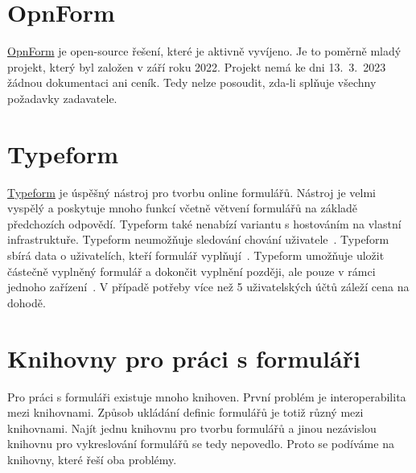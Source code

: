 \section*{OpnForm}\label{sec:opnform}

\href{https://opnform.com/}{OpnForm} je open-source řešení, které je aktivně vyvíjeno.
Je to poměrně mladý projekt, který byl založen v září roku 2022.
Projekt nemá ke dni 13.~3.~2023 žádnou dokumentaci ani ceník.
Tedy nelze posoudit, zda-li splňuje všechny požadavky zadavatele.

\section*{Typeform}\label{sec:typeform}

\href{https://www.typeform.com/}{Typeform} je úspěšný nástroj pro tvorbu online formulářů.
Nástroj je velmi vyspělý a poskytuje mnoho funkcí včetně větvení formulářů na základě předchozích odpovědí.
Typeform také nenabízí variantu s hostováním na vlastní infrastruktuře.
Typeform neumožňuje sledování chování uživatele~\cite{user-tracking-typeform}.
Typeform sbírá data o uživatelích, kteří formulář vyplňují~\cite{user-data-typeform}.
Typeform umožňuje uložit částečně vyplněný formulář a dokončit vyplnění později, ale pouze v rámci jednoho zařízení~\cite{save-and-return-typeform}.
V případě potřeby více než 5 uživatelských účtů záleží cena na dohodě.

\section*{Knihovny pro práci s formuláři}\label{sec:knihovny-pro-praci-s-formulari}

Pro práci s formuláři existuje mnoho knihoven.
První problém je interoperabilita mezi knihovnami.
Způsob ukládání definic formulářů je totiž různý mezi knihovnami.
Najít jednu knihovnu pro tvorbu formulářů a jinou nezávislou knihovnu pro vykreslování formulářů se tedy nepovedlo.
Proto se podíváme na knihovny, které řeší oba problémy.

